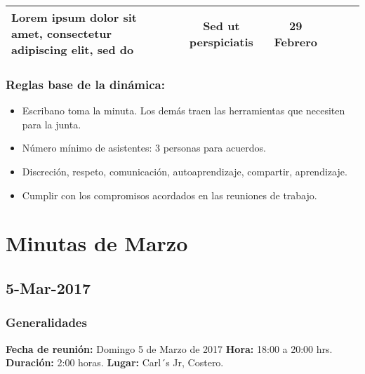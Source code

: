 \documentclass[]{book}
\providecommand{\tightlist}{%
  \setlength{\itemsep}{0pt}\setlength{\parskip}{0pt}}
\begin{document}
\begin{longtable}[]{@{}lcccll@{}}
\begin{minipage}[t]{0.27\columnwidth}
Lorem ipsum dolor sit amet, consectetur adipiscing elit, sed do\strut
\end{minipage} & \begin{minipage}[t]{0.09\columnwidth}\centering\strut
Sed ut perspiciatis\strut
\end{minipage} & \begin{minipage}[t]{0.08\columnwidth}\raggedright\strut
29 Febrero\strut
\end{minipage} & \begin{minipage}[t]{0.22\columnwidth}\raggedright\strut
\strut
\end{minipage}\tabularnewline
\bottomrule
\end{longtable}

\subsection{Reglas base de la
dinámica:}\label{reglas-base-de-la-dinamica}

\begin{itemize}
\tightlist
\item
  Escribano toma la minuta. Los demás traen las herramientas que
  necesiten para la junta.
\item
  Número mínimo de asistentes: 3 personas para acuerdos.
\item
  Discreción, respeto, comunicación, autoaprendizaje, compartir,
  aprendizaje.
\item
  Cumplir con los compromisos acordados en las reuniones de trabajo.
\end{itemize}

\chapter{Minutas de Marzo}\label{minutas-de-marzo}

\section{5-Mar-2017}\label{mar-2017}

\subsection{Generalidades}\label{generalidades-1}

\textbf{Fecha de reunión:} Domingo 5 de Marzo de 2017 \textbf{Hora:}
18:00 a 20:00 hrs. \textbf{Duración:} 2:00 horas. \textbf{Lugar:} Carl´s
Jr, Costero.
\end{document}
